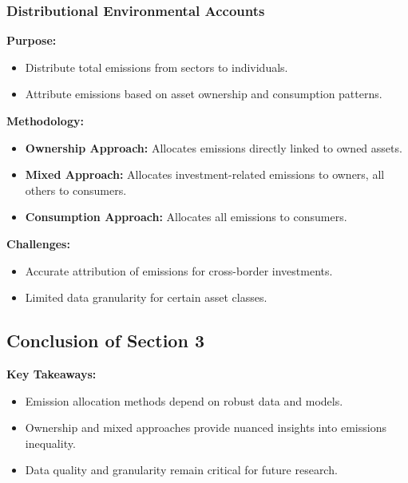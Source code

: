 \documentclass[10pt]{beamer}
\begin{document}
\subsubsection{Distributional Environmental Accounts}
\begin{frame}{\subsubsecname}
    \textbf{Purpose:}
    \begin{itemize}
        \item Distribute total emissions from sectors to individuals.
        \item Attribute emissions based on asset ownership and consumption patterns.
    \end{itemize}

    \textbf{Methodology:}
    \begin{itemize}
        \item \textbf{Ownership Approach:} Allocates emissions directly linked to owned assets.
        \item \textbf{Mixed Approach:} Allocates investment-related emissions to owners, all others to consumers.
        \item \textbf{Consumption Approach:} Allocates all emissions to consumers.
    \end{itemize}
    \vspace{0.3cm}
    \textbf{Challenges:}
    \begin{itemize}
        \item Accurate attribution of emissions for cross-border investments.
        \item Limited data granularity for certain asset classes.
    \end{itemize}
\end{frame}

\subsection{Conclusion of Section 3}
\begin{frame}{\subsecname}
    \textbf{Key Takeaways:}
    \begin{itemize}
        \item Emission allocation methods depend on robust data and models.
        \item Ownership and mixed approaches provide nuanced insights into emissions inequality.
        \item Data quality and granularity remain critical for future research.
    \end{itemize}
\end{frame}
\end{document}
